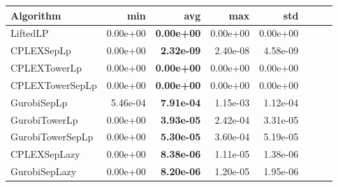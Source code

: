 \begin{tabular}{lrrrrrrr}
Algorithm & min & avg & max & std
\\
\hline
LiftedLP&0.00e+00& \bf0.00e+00& 0.00e+00& 0.00e+00\\
CPLEXSepLp&0.00e+00& \bf2.32e-09& 2.40e-08& 4.58e-09\\
CPLEXTowerLp&0.00e+00& \bf0.00e+00& 0.00e+00& 0.00e+00\\
CPLEXTowerSepLp&0.00e+00& \bf0.00e+00& 0.00e+00& 0.00e+00\\
GurobiSepLp&5.46e-04& \bf7.91e-04& 1.15e-03& 1.12e-04\\
GurobiTowerLp&0.00e+00& \bf3.93e-05& 2.42e-04& 3.31e-05\\
GurobiTowerSepLp&0.00e+00& \bf5.30e-05& 3.60e-04& 5.19e-05\\
CPLEXSepLazy&0.00e+00& \bf8.38e-06& 1.11e-05& 1.38e-06\\
GurobiSepLazy&0.00e+00& \bf8.20e-06& 1.20e-05& 1.95e-06
\end{tabular}
